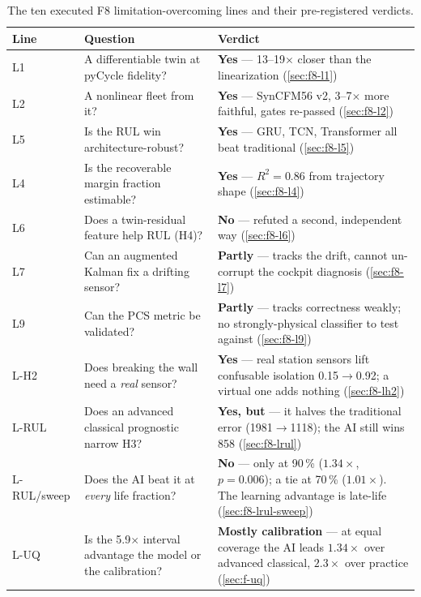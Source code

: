 \begin{table}[htbp]
  \centering\small
  \caption{The ten executed F8 limitation-overcoming lines and their pre-registered verdicts.}
  \label{tab:f8-summary}
  \begin{tabular}{>{\raggedright\arraybackslash}p{}>{\raggedright\arraybackslash}p{}>{\raggedright\arraybackslash}p{}}
    \toprule
    Line & Question & Verdict \\
    \midrule
    L1 & A differentiable twin at pyCycle fidelity? & \textbf{Yes} --- 13--19$\times$ closer than the linearization (\cref{sec:f8-l1}) \\
    L2 & A nonlinear fleet from it? & \textbf{Yes} --- SynCFM56 v2, 3--7$\times$ more faithful, gates re-passed (\cref{sec:f8-l2}) \\
    L5 & Is the RUL win architecture-robust? & \textbf{Yes} --- GRU, TCN, Transformer all beat traditional (\cref{sec:f8-l5}) \\
    L4 & Is the recoverable margin fraction estimable? & \textbf{Yes} --- $R^2 = 0.86$ from trajectory shape (\cref{sec:f8-l4}) \\
    L6 & Does a twin-residual feature help RUL (H4)? & \textbf{No} --- refuted a second, independent way (\cref{sec:f8-l6}) \\
    L7 & Can an augmented Kalman fix a drifting sensor? & \textbf{Partly} --- tracks the drift, cannot un-corrupt the cockpit diagnosis (\cref{sec:f8-l7}) \\
    L9 & Can the PCS metric be validated? & \textbf{Partly} --- tracks correctness weakly; no strongly-physical classifier to test against (\cref{sec:f8-l9}) \\
    L-H2 & Does breaking the wall need a \emph{real} sensor? & \textbf{Yes} --- real station sensors lift confusable isolation 0.15$\to$0.92; a virtual one adds nothing (\cref{sec:f8-lh2}) \\
    L-RUL & Does an advanced classical prognostic narrow H3? & \textbf{Yes, but} --- it halves the traditional error (1981$\to$1118); the AI still wins 858 (\cref{sec:f8-lrul}) \\
    L-RUL/sweep & Does the AI beat it at \emph{every} life fraction? & \textbf{No} --- only at 90\,\% ($1.34\times$, $p=0.006$); a tie at 70\,\% ($1.01\times$). The learning advantage is late-life (\cref{sec:f8-lrul-sweep}) \\
    L-UQ & Is the 5.9$\times$ interval advantage the model or the calibration? & \textbf{Mostly calibration} --- at equal coverage the AI leads $1.34\times$ over advanced classical, $2.3\times$ over practice (\cref{sec:f-uq}) \\

\end{tabular}
\end{table}
